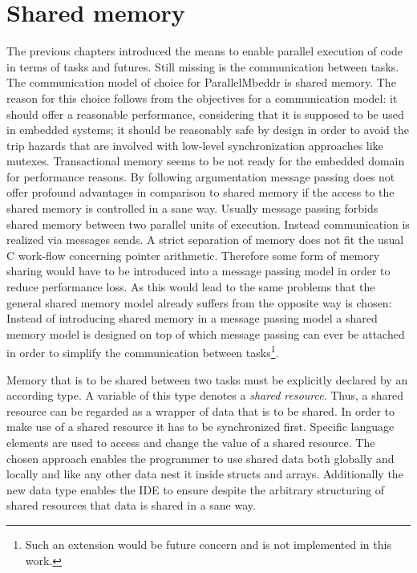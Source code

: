 \section{Shared memory}
\label{sharedMemory}
The previous chapters introduced the means to enable parallel execution of code in terms of tasks and futures. Still missing is the communication between tasks. The communication model of choice for ParallelMbeddr is shared memory. The reason for this choice follows from the objectives for a communication model: it should offer a reasonable performance, considering that it is supposed to be used in embedded systems; it should be reasonably safe by design in order to avoid the trip hazards that are involved with low-level synchronization approaches like mutexes. Transactional memory seems to be not ready for the embedded domain for performance reasons. By following argumentation message passing does not offer profound advantages in comparison to shared memory if the access to the shared memory is controlled in a sane way. Usually message passing forbids shared memory between two parallel units of execution. Instead communication is realized via messages sends. A strict separation of memory does not fit the usual C work-flow concerning pointer arithmetic. Therefore some form of memory sharing would have to be introduced into a message passing model in order to reduce performance loss. As this would lead to the same problems that the general shared memory model already suffers from the opposite way is chosen: Instead of introducing shared memory in a message passing model a shared memory model is designed on top of which message passing can ever be attached in order to simplify the communication between tasks\footnote{Such an extension would be future concern and is not implemented in this work.}.

Memory that is to be shared between two tasks must be explicitly declared by an according type. A variable of this type denotes a \textit{shared resource}. Thus, a shared resource can be regarded as a wrapper of data that is to be shared. In order to make use of a shared resource it has to be synchronized first. Specific language elements are used to access and change the value of a shared resource. The chosen approach enables the programmer to use shared data both globally and locally and like any other data nest it inside structs and arrays. Additionally the new data type enables the IDE to ensure despite the arbitrary structuring of shared resources that data is shared in a sane way.

